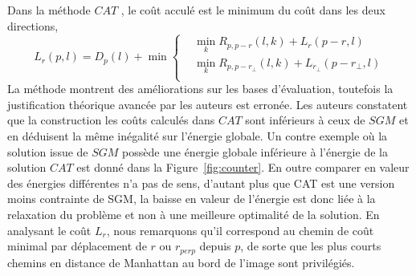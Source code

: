 \documentclass[../main/These_Mathias_Paget.tex]{subfiles}
\begin{document}
 Dans la méthode $CAT$ \cite{Ha15ICIP}, le coût acculé est le minimum du coût dans les deux directions, 
\begin{equation}
	L_r(p,l) = D_{p}(l) + \min{
  \left\{
      \begin{aligned}
      &  \min_{k}{R_{p,p{-}r}(l,k) + L_{r}(p{-}r,l)} \\
      &  \min_{k}{R_{p,p{-}r_{\perp}}(l,k) + L_{r_{\perp}}(p{-}r_{\perp},l)}  \\
      \end{aligned}
    \right.
    }
    \label{eq:CAT}
\end{equation}
La méthode montrent des améliorations sur les bases d'évaluation, toutefois la justification théorique avancée par les auteurs est erronée. Les auteurs constatent que la construction les coûts calculés dans $CAT$ sont inférieurs à ceux de $SGM$ et en déduisent la même inégalité sur l’énergie globale. Un contre exemple où la solution issue de $SGM$ possède une énergie globale inférieure à l’énergie de la solution $CAT$ est donné dans la Figure~\ref{fig:counter}. En outre comparer en valeur des énergies différentes n'a pas de sens, d'autant plus que CAT est une version moins contrainte de SGM, la baisse en valeur de l'énergie est donc liée à la relaxation du problème et non à une meilleure optimalité de la solution. En analysant le coût $L_r$, nous remarquons qu'il correspond au chemin de coût minimal par déplacement de $r$ ou $r_{perp}$ depuis $p$, de sorte que les plus courts chemins en distance de Manhattan au bord de l'image sont privilégiés.
\end{document}
